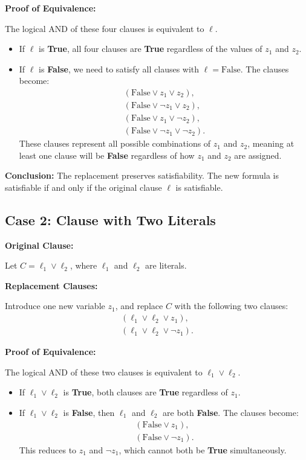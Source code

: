 \documentclass[a4paper]{article}
\begin{document}
\textbf{Proof of Equivalence:}

The logical AND of these four clauses is equivalent to \( \ell \).
\begin{itemize}
    \item If \( \ell \) is \textbf{True}, all four clauses are \textbf{True} regardless of the values of \( z_1 \) and \( z_2 \).
    \item If \( \ell \) is \textbf{False}, we need to satisfy all clauses with \( \ell = \text{False} \). The clauses become:
\begin{align*}
    (\text{False} \lor z_1 \lor z_2), \\
    (\text{False} \lor \neg z_1 \lor z_2), \\
    (\text{False} \lor z_1 \lor \neg z_2), \\
    (\text{False} \lor \neg z_1 \lor \neg z_2).
\end{align*}
These clauses represent all possible combinations of \( z_1 \) and \( z_2 \), meaning at least one clause will be \textbf{False} regardless of how \( z_1 \) and \( z_2 \) are assigned.
\end{itemize}

\textbf{Conclusion:} The replacement preserves satisfiability. The new formula is satisfiable if and only if the original clause \( \ell \) is satisfiable.

\subsection*{Case 2: Clause with Two Literals}

\textbf{Original Clause:}

Let \( C = \ell_1 \lor \ell_2 \), where \( \ell_1 \) and \( \ell_2 \) are literals.

\textbf{Replacement Clauses:}

Introduce one new variable \( z_1 \), and replace \( C \) with the following two clauses:
\begin{align*}
    (\ell_1 \lor \ell_2 \lor z_1), \\
    (\ell_1 \lor \ell_2 \lor \neg z_1).
\end{align*}

\textbf{Proof of Equivalence:}

The logical AND of these two clauses is equivalent to \( \ell_1 \lor \ell_2 \).
\begin{itemize}
    \item If \( \ell_1 \lor \ell_2 \) is \textbf{True}, both clauses are \textbf{True} regardless of \( z_1 \).
    \item If \( \ell_1 \lor \ell_2 \) is \textbf{False}, then \( \ell_1 \) and \( \ell_2 \) are both \textbf{False}. The clauses become:
    \begin{align*}
        (\text{False} \lor z_1), \\
        (\text{False} \lor \neg z_1).
    \end{align*}
    This reduces to \( z_1 \) and \( \neg z_1 \), which cannot both be \textbf{True} simultaneously.
\end{itemize}
\end{document}
